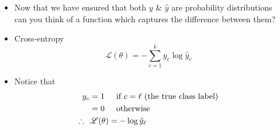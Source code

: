 \begin{frame}
  \begin{columns}
    \begin{overlayarea}{\textwidth}{\textheight}
      \vspace{0.3cm}
      \makebox[\textwidth][c]{\usebox{\nnfruitclassexamplecontent}}
    \end{overlayarea}

    \begin{overlayarea}{\textwidth}{\textheight}
      \begin{itemize}
        \justifying
        \item<1-> Now that we have ensured that both $y$ \& $\hat{y}$ are probability distributions can you think of a function which captures the difference between them?
        \item<2-> Cross-entropy \begin{equation*}
              \mathscr{L}(\theta) = - \sum_{c=1}^{k} y_c \log \hat{y}_c
            \end{equation*}
        \item<3-> Notice that \begin{align*}
              y_c                 & = 1 \hspace{0.5cm} \text{if $c=\ell$ (the true class label)} \\
                        & = 0 \hspace{0.5cm} \text{otherwise}                          \\
              \therefore~~ &\mathscr{L}(\theta)  = - \log \hat{y}_{\ell}
            \end{align*}
      \end{itemize}
    \end{overlayarea}
  \end{columns}
\end{frame}

